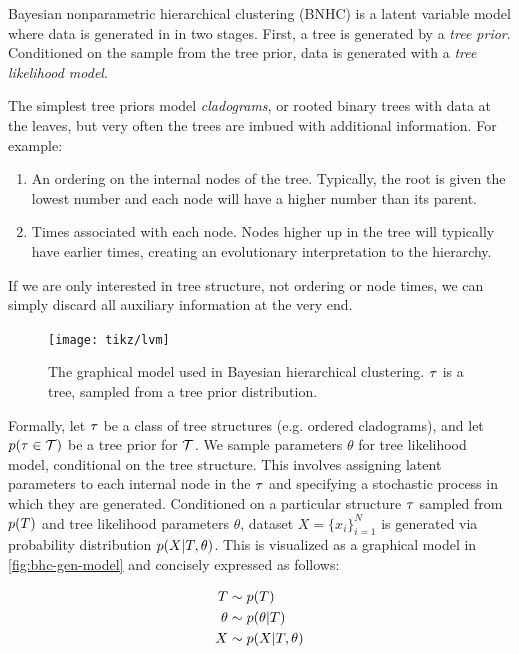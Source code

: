 Bayesian nonparametric hierarchical clustering (BNHC)
is a latent variable model where
data is generated in
in two stages.
First, a tree is generated by a
\emph{tree prior}.
Conditioned on the sample
from the tree prior,
data is generated with
a \emph{tree likelihood model}.

The simplest tree priors
model \emph{cladograms},
or rooted binary trees
with data at the leaves,
but very often the trees are imbued with
additional information.
For example:

\begin{enumerate}
  \item An ordering on the internal nodes of the tree.
    Typically, the root is given the lowest number and
    each node will have a higher number than its parent.
  \item Times associated with each node.
    Nodes higher up in the tree will typically have
    earlier times, creating an evolutionary
    interpretation to the hierarchy.
\end{enumerate}

If we are only interested in tree structure,
not ordering or node times, we can simply discard
all auxiliary information at the very end.

\begin{figure}[H]
  \centering
  \texttt{[image: tikz/lvm]}
  \caption{The graphical model used
  in Bayesian hierarchical clustering. $\tau$
  is a tree, sampled from a tree prior distribution.}
  \label{fig:bhc-gen-model}
\end{figure}

Formally,
let $\tau$ be a class
of tree structures (e.g. ordered cladograms),
and let $p(\tau \in \mathcal{T})$
be a tree prior
for $\mathcal{T}$.
We sample parameters $\theta$ for tree likelihood model,
conditional on the tree structure.
This involves assigning
latent parameters to each internal node in the $\tau$
and specifying a stochastic process in which they are generated.
Conditioned on a particular
structure $\tau$ sampled from $p(T)$
and tree likelihood parameters $\theta$, dataset
$X = {\{x_i\}}_{i = 1}^N$
is generated
via probability distribution $p(X | T, \theta)$.
This is visualized as a graphical model in \autoref{fig:bhc-gen-model}
and concisely expressed as follows:

\begin{align*}
  T &\sim p(T) \\
  \theta &\sim p(\theta | T) \\
  X &\sim p(X | T, \theta)
\end{align*}

